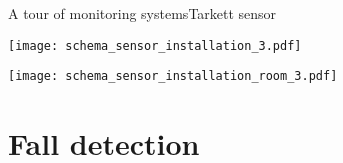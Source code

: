 \begin{frame}{A tour of monitoring systems}{Tarkett sensor}
\begin{minipage}[t]{0.64\linewidth}
    \begin{minipage}[b]{0.45\linewidth}
    \centering
    \texttt{[image: schema\_sensor\_installation\_3.pdf]}
    
    \end{minipage}
    \hfill
    \begin{minipage}[b]{0.54\linewidth}
    \centering
    \texttt{[image: schema\_sensor\_installation\_room\_3.pdf]}
    
    \end{minipage}
\end{minipage}

\end{frame}

\section{Fall detection}
